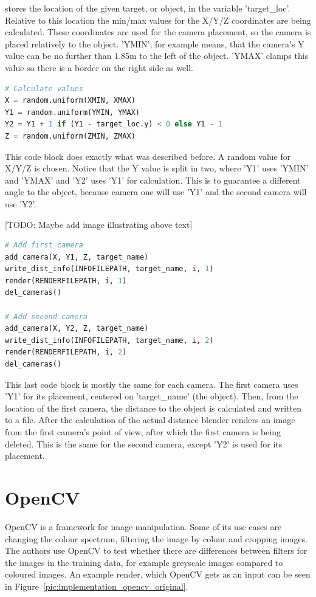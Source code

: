 stores the location of the given target, or object, in the variable 'target\_loc'. Relative to this location the min/max values for the X/Y/Z coordinates are being calculated. These coordinates are used for the camera placement, so the camera is placed relatively to the object. 'YMIN', for example means, that the camera's Y value can be no further than 1.85m to the left of the object. 'YMAX' clamps this value so there is a border on the right side as well.

\begin{lstlisting}[language=python]
# Calculate values
X = random.uniform(XMIN, XMAX)
Y1 = random.uniform(YMIN, YMAX)
Y2 = Y1 + 1 if (Y1 - target_loc.y) < 0 else Y1 - 1
Z = random.uniform(ZMIN, ZMAX)
\end{lstlisting}

This code block does exactly what was described before. A random value for X/Y/Z is chosen. Notice that the Y value is split in two, where 'Y1' uses 'YMIN' and 'YMAX' and 'Y2' uses 'Y1' for calculation. This is to guarantee a different angle to the object, because camera one will use 'Y1' and the second camera will use 'Y2'.

[TODO: Maybe add image illustrating above text]

\begin{lstlisting}[language=python]
# Add first camera
add_camera(X, Y1, Z, target_name)
write_dist_info(INFOFILEPATH, target_name, i, 1)
render(RENDERFILEPATH, i, 1)
del_cameras()

# Add second camera
add_camera(X, Y2, Z, target_name)
write_dist_info(INFOFILEPATH, target_name, i, 2)
render(RENDERFILEPATH, i, 2)
del_cameras()
\end{lstlisting}

This last code block is mostly the same for each camera. The first camera uses 'Y1' for its placement, centered on 'target\_name' (the object). Then, from the location of the first camera, the distance to the object is calculated and written to a file. After the calculation of the actual distance blender renders an image from the first camera's point of view, after which the first camera is being deleted. This is the same for the second camera, except 'Y2' is used for its placement.

\section{OpenCV}
OpenCV is a framework for image manipulation. Some of its use cases are changing the colour spectrum, filtering the image by colour and cropping images. The authors use OpenCV to test whether there are differences between filters for the images in the training data, for example greyscale images compared to coloured images. An example render, which OpenCV gets as an input can be seen in Figure~\ref{pic:implementation_opencv_original}.

